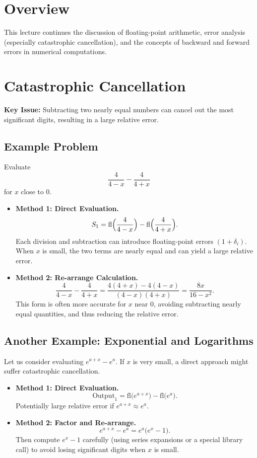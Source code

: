 \section{Overview}

This lecture continues the discussion of floating-point arithmetic, error analysis (especially catastrophic cancellation), and the concepts of backward and forward errors in numerical computations.

\section{Catastrophic Cancellation}

\noindent
\textbf{Key Issue:} Subtracting two nearly equal numbers can cancel out the most significant digits, resulting in a large relative error.

\subsection{Example Problem}

Evaluate
\[
\frac{4}{4 - x} - \frac{4}{4 + x}
\]
for $x$ close to $0$.

\begin{itemize}
  \item \textbf{Method 1: Direct Evaluation.}
  \[
    S_1 = \mathrm{fl}\Bigl(\frac{4}{4 - x}\Bigr) - \mathrm{fl}\Bigl(\frac{4}{4 + x}\Bigr).
  \]
  Each division and subtraction can introduce floating-point errors $(1 + \delta_i)$. When $x$ is small, the two terms are nearly equal and can yield a large relative error.

  \item \textbf{Method 2: Re-arrange Calculation.}
  \[
    \frac{4}{4 - x} - \frac{4}{4 + x}
    = \frac{4(4 + x) - 4(4 - x)}{(4 - x)(4 + x)}
    = \frac{8x}{16 - x^2}.
  \]
  This form is often more accurate for $x$ near $0$, avoiding subtracting nearly equal quantities, and thus reducing the relative error.
\end{itemize}

\subsection{Another Example: Exponential and Logarithms}

Let us consider evaluating \(\displaystyle e^{a+x} - e^a\). If \(x\) is very small, a direct approach might suffer catastrophic cancellation.

\begin{itemize}
  \item \textbf{Method 1: Direct Evaluation.}
  \[
    \mathrm{Output}_1 
    = \mathrm{fl}\bigl(e^{a+x}\bigr) 
      - \mathrm{fl}\bigl(e^a\bigr).
  \]
  Potentially large relative error if \(e^{a+x} \approx e^a\).

  \item \textbf{Method 2: Factor and Re-arrange.}
  \[
    e^{a+x} - e^a 
    = e^a \bigl(e^x - 1\bigr).
  \]
  Then compute \(e^x - 1\) carefully (using series expansions or a special library call) to avoid losing significant digits when \(x\) is small.
\end{itemize}

